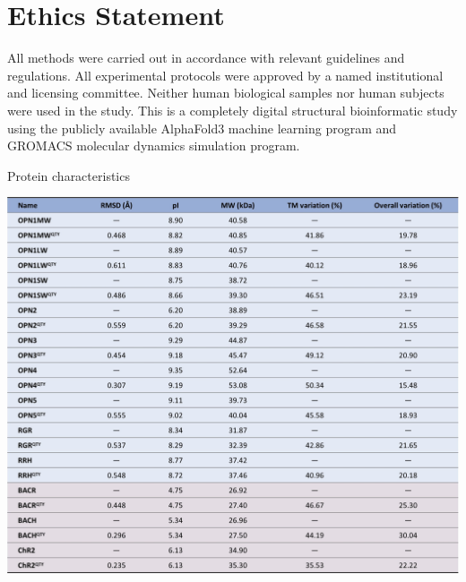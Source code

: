 \documentclass[fleqn,10pt,lineno]{manuscript}
\begin{document}
\section*{Ethics Statement}

All methods were carried out in accordance with relevant guidelines and regulations. All experimental protocols were approved by a named institutional and licensing committee. Neither human biological samples nor human subjects were used in the study. This is a completely digital structural bioinformatic study using the publicly available AlphaFold3 machine learning program and GROMACS molecular dynamics simulation program.




\begin{table}[htbp]
	\centering
	\caption{Protein characteristics}
	\label{tb:characteristics}
	\includegraphics[width=\linewidth]{Figures/characteristics.jpg}
\end{table}
\end{document}
